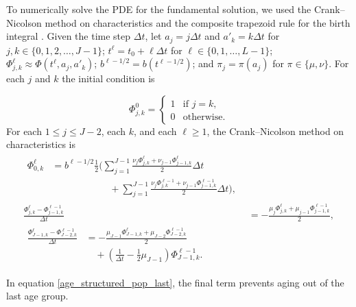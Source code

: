 \documentclass{jpmarticle}
\let\subequationsorig\subequations%
\let\endsubequationsorig\endsubequations%
\renewenvironment{subequations}{
  \subequationsorig
  \renewcommand{\theequation}{\theparentequation.\arabic{equation}}
}{
  \endsubequationsorig
}
\begin{document}
To numerically solve the PDE for the fundamental solution, we used the
Crank--Nicolson method on characteristics and the composite trapezoid
rule for the birth integral \autocite{milner_1992}.  Given the time
step $\Delta t$, let $a_j = j \Delta t$ and $a'_k = k \Delta t$ for
$j, k \in \{0, 1, 2, \ldots, J - 1\}$;
$t^{\ell} = t_0 + \ell \Delta t$ for
$\ell \in \{0, 1, \ldots, L - 1\}$;
$\Phi_{j, k}^{\ell} \approx \Phi(t^{\ell}, a_j, a'_k)$;
$b^{\ell - 1 / 2} = b(t^{\ell - 1 / 2})$; and
$\pi_j = \pi(a_j)$ for $\pi \in \{\mu, \nu\}$.
For each $j$ and $k$ the initial condition is
\begin{subequations}
  \begin{equation}
    \Phi_{j, k}^0 =
    \begin{cases}
      1 & \text{if $j = k$}, \\
      0 & \text{otherwise}.
    \end{cases}
  \end{equation}
  For each $1 \leq j \leq J - 2$, each $k$, and each $\ell
  \geq 1$, the Crank--Nicolson method on characteristics is
  \begin{align}
    \begin{split}
      \Phi_{0, k}^{\ell}
      &= b^{\ell - 1 / 2}
      \frac{1}{2}
      \Bigg(\sum_{j = 1}^{J - 1}
      \frac{\nu_j \Phi_{j, k}^{\ell}
        + \nu_{j - 1} \Phi_{j - 1, k}^{\ell}}
      {2}
      \Delta t
      \\ & \quad\quad\quad\quad\quad\quad {}
      + \sum_{j = 1}^{J - 1}
      \frac{\nu_j \Phi_{j, k}^{\ell - 1}
        + \nu_{j - 1} \Phi_{j - 1, k}^{\ell - 1}}
      {2}
      \Delta t
      \Bigg),
    \end{split}
    \\
    \frac{\Phi_{j, k}^{\ell} - \Phi_{j - 1, k}^{\ell - 1}}{\Delta t}
    &= - \frac{\mu_j \Phi_{j, k}^{\ell}
      + \mu_{j - 1} \Phi_{j - 1, k}^{\ell - 1}}{2},
    \\
    \begin{split}
      \frac{\Phi_{J - 1, k}^{\ell} - \Phi_{J - 2, k}^{\ell - 1}}{\Delta t}
      &= - \frac{\mu_{J - 1} \Phi_{J - 1, k}^{\ell}
        + \mu_{J - 2} \Phi_{J - 2, k}^{\ell - 1}}{2}
      \\
      & \quad {}
      + \left(\frac{1}{\Delta t} - \frac{1}{2} \mu_{J - 1}\right)
      \Phi_{J - 1, k}^{\ell - 1}.
    \end{split}
    \label{age_structured_pop_last}
  \end{align}
\end{subequations}
In equation \eqref{age_structured_pop_last}, the final term prevents
aging out of the last age group.
\end{document}
